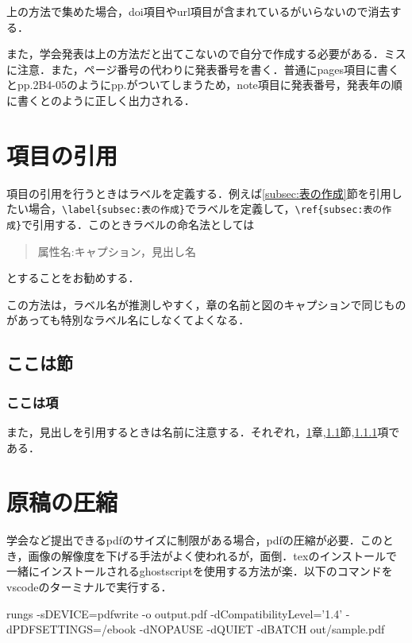 \documentclass[twocolumn, a4paper]{Zemiresume}
\begin{document}
上の方法で集めた場合，doi項目やurl項目が含まれているがいらないので消去する．

また，学会発表は上の方法だと出てこないので自分で作成する必要がある．ミスに注意．また，ページ番号の代わりに発表番号を書く．普通にpages項目に書くとpp.2B4-05のようにpp.がついてしまうため，note項目に発表番号，発表年の順に書くと\cite{cite:my_si}のように正しく出力される．
\section{項目の引用}\label{sec:ここは章}
項目の引用を行うときはラベルを定義する．例えば\ref{subsec:表の作成}節を引用したい場合，\verb|\label{subsec:表の作成}|でラベルを定義して，\verb|\ref{subsec:表の作成}|で引用する．このときラベルの命名法としては
\begin{quote}
  属性名:キャプション，見出し名
\end{quote}
とすることをお勧めする．

この方法は，ラベル名が推測しやすく，章の名前と図のキャプションで同じものがあっても特別なラベル名にしなくてよくなる．

\subsection{ここは節}\label{subsec:ここは節}
\subsubsection{ここは項}\label{subsubsec:ここは項}

また，見出しを引用するときは名前に注意する．それぞれ，\ref{sec:ここは章}章,\ref{subsec:ここは節}節,\ref{subsubsec:ここは項}項である．
\section{原稿の圧縮}
学会など提出できるpdfのサイズに制限がある場合，pdfの圧縮が必要．このとき，画像の解像度を下げる手法がよく使われるが，面倒．texのインストールで一緒にインストールされるghostscriptを使用する方法が楽．以下のコマンドをvscodeのターミナルで実行する．

{
  \small %
  rungs -sDEVICE=pdfwrite -o output.pdf -dCompatibilityLevel='1.4' -dPDFSETTINGS=/ebook  -dNOPAUSE -dQUIET -dBATCH out/sample.pdf
}
\end{document}
